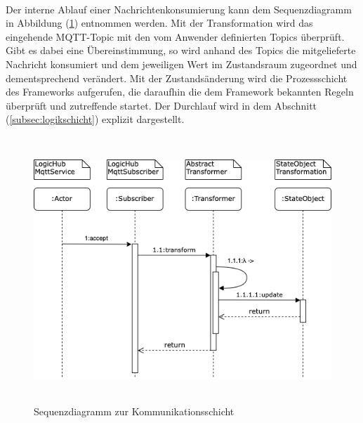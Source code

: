     \pagebreak
    \\
    Der interne Ablauf einer Nachrichtenkonsumierung kann dem Sequenzdiagramm in Abbildung (\ref{fig:kommunikationsequenz}) entnommen werden. Mit der Transformation 
    wird das eingehende \acs{MQTT}-Topic mit den vom Anwender definierten Topics überprüft. Gibt es dabei eine Übereinstimmung, so wird anhand des Topics die mitgelieferte 
    Nachricht konsumiert und dem jeweiligen Wert im Zustandsraum zugeordnet und dementsprechend verändert. Mit der Zustandsänderung wird die 
    Prozessschicht des Frameworks aufgerufen, die daraufhin die dem Framework bekannten Regeln überprüft und zutreffende startet. Der Durchlauf wird in dem Abschnitt (\ref{subsec:logikschicht}) 
    explizit dargestellt. 
    \begin{figure}[hbt!]
        \centering
        \includegraphics[width=14cm,height=10cm,keepaspectratio]{images/Kommunikationsschicht_Sequenz_Final.png}
        \caption{Sequenzdiagramm zur Kommunikationsschicht}
        \label{fig:kommunikationsequenz}
    \end{figure}
